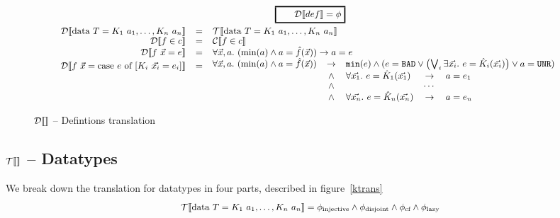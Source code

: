 \documentclass[preprint]{sigplanconf}
\begin{document}
\begin{figure}
\[
\begin{array}{rcl}
  \multicolumn{3}{c}{\ruleform{\dtrans{def} = \phi}} \\[2.5mm]
  \dtrans{\mbox{data } T = K_1~a_1, \dots, K_n~a_n} &=& \ttrans{\mbox{data } T = K_1~a_1, \dots, K_n~a_n} \\
  \dtrans{f \in c} &=& \ctrans{f \in c}\\
  \dtrans{f~\vec{x} = e} &=& \forall \vec{x},a.~ (\min{a} \land a =
  \full{f}(\vec{x})) \to a = e \\
   \raisebox{ 0.5 cm }{$\dtrans{f~\vec{x} = \mbox{case } e \mbox{ of } [K_i~\vec{x_i} = e_i]}$} &\raisebox{0.5cm}{=}&  \hspace{-0.18cm} \begin{array}{rclcl}
     \forall \vec{x},a.~(\mbox{min}(a) \land a = \full{f}(\vec{x})) &\to&
     \multicolumn{3}{c}{  \texttt{min}(e) \land (e = \texttt{BAD} \lor
       \left(\bigvee_i \exists \vec{x_i}.~e = \full{K}_i(\vec{x_i})\right) \lor a = \texttt{UNR})} \\
     &\land& \forall \vec{x_1}.~e = \full{K}_1(\vec{x_1}) &\to& a = e_1 \\
     &\land& & \cdots & \\
     &\land& \forall \vec{x_n}.~e = \full{K}_n(\vec{x_n}) &\to& a = e_n \\
   \end{array} 
\end{array}
\]
\caption{$\dtrans{}$ -- Defintions translation}
 \label{dtrans}
\end{figure}



\subsection{$\ttrans{}$ -- Datatypes}
We break down the translation for datatypes in four parts, described in figure~\ref{ktrans}
$$\ttrans{\mbox{data } T = K_1~a_1, \dots, K_n~a_n} = \phi_\text{injective} \land \phi_\text{disjoint} \land \phi_\text{cf} \land \phi_\text{lazy}$$
\end{document}
